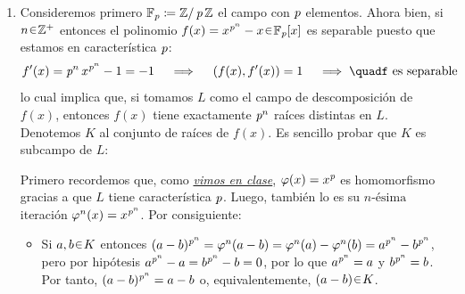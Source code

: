 \begin{sol}\hphantom{x}
\begin{enumerate}[label=\alph*)]
\item 
Consideremos primero $\mathbb{F}_{\operatorname{\textit{p}}} \coloneq \mathbb{Z}/\operatorname{\textit{p}}\mathbb{Z}$ el campo con $\operatorname{\textit{p}}$ elementos. Ahora bien, si $n\en\mathbb{Z}^+$ entonces el polinomio $f(x) = x^{\p^n}-x \en \mathbb{F}_{\p}[x]$ es separable  puesto que estamos en característica $\operatorname{\textit{p}}$:
\[
f'(x) = \p^nx^{\p^n}-1 = -1%
\quad\implies\quad%
(f(x),f'(x)) = 1%
\quad\implies\quad%
f\text{ es separable}
\]
lo cual implica que, si tomamos $L$ como el campo de descomposición de $f(x)$, entonces $f(x)$ tiene exactamente $\operatorname{\textit{p}}^n$ raíces distintas en $L$. Denotemos $K$ al conjunto de raíces de $f(x)$. Es sencillo probar que $K$ es subcampo de $L$:\par
Primero recordemos que, como \href{https://drive.google.com/file/d/15iH5PhKTc8cBRWBbSiZoBqLWRe-y-EZg/view?usp=sharing}{\emph{vimos en clase}}, $\varphi(x) = x^{\operatorname{\textit{p}}}$ es homomorfismo gracias a que $L$ tiene característica $\operatorname{\textit{p}}$. Luego, también lo es su $n\text{-ésima}$ iteración $\varphi^n(x) = x^{\operatorname{\textit{p}}^n}$. Por consiguiente:
\begin{itemize}
    \item Si $a,b\en K$ entonces $(a-b)^{\operatorname{\textit{p}}^n} = \varphi^n(a-b) = \varphi^n(a) - \varphi^n(b) = a^{\operatorname{\textit{p}}^n} - b^{\operatorname{\textit{p}}^n}$, pero por hipótesis $a^{\operatorname{\textit{p}}^n}-a=b^{\operatorname{\textit{p}}^n}-b=0$, por lo que $a^{\operatorname{\textit{p}}^n}=a$ y $b^{\operatorname{\textit{p}}^n}=b$. Por tanto, $(a-b)^{\operatorname{\textit{p}}^n} = a-b$ o, equivalentemente, $(a-b) \en K$.


\end{itemize}
\end{enumerate}
\end{sol}
